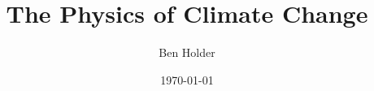\documentclass[12pt, oneside]{book}
\begin{document}
\frontmatter

\title{The Physics of Climate Change}
\author{Ben Holder}
\date{\today}
\maketitle
\tableofcontents


\mainmatter













\backmatter

\end{document}
